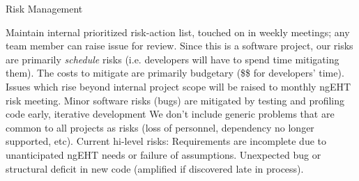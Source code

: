 \documentclass[8pt]{beamer}
\begin{document}











\begin{frame}{Risk Management}

\begin{outline}
    \1 Maintain internal prioritized risk-action list, touched on in weekly meetings; any team member can raise issue for review.
    \1 Since this is a software project, our risks are primarily \emph{schedule} risks (i.e. developers will have to spend time mitigating them). The costs to mitigate are primarily budgetary (\$\$ for developers' time).
    \2 Issues which rise beyond internal project scope will be raised to monthly ngEHT risk meeting.
    \2 Minor software risks (bugs) are mitigated by testing and profiling code early, iterative development
    \1 We don't include generic problems that are common to all projects as risks (loss of personnel, dependency no longer supported, etc).
    \1 Current hi-level risks:
        \2 Requirements are incomplete due to unanticipated ngEHT needs or failure of assumptions.
        \2 Unexpected bug or structural deficit in new code (amplified if discovered late in process).
\end{outline}

\end{frame}
\end{document}
